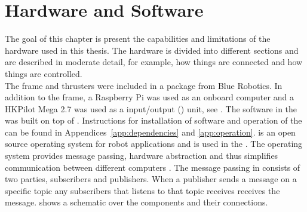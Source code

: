 \chapter{Hardware and Software}\label{cha:hardware}
The goal of this chapter is present the capabilities and limitations of the hardware used in this thesis. The hardware is divided into different sections and are described in moderate detail, for example, how things are connected and how things are controlled.\\
The \abbrROV frame and thrusters were included in a package from Blue Robotics. In addition to the \abbrROV frame, a Raspberry Pi was used as an onboard computer and a HKPilot Mega 2.7  was used as a input/output (\abbrIO) unit, see . The software in the \abbrROV was built on top of \abbrROS.  Instructions for installation of software and operation of the \abbrROV can be found in Appendices~\ref{app:dependencies} and \ref{app:operation}. \abbrROS is an open source operating system for robot applications and is used in the \abbrROV. The operating system provides message passing, hardware abstraction and thus simplifies communication between different computers \citep{ROS}. The message passing in \abbrROS consists of two parties, subscribers and publishers. When a publisher sends a message on a specific topic any subscribers that listens to that topic receives receives the message.  shows a schematic over the \abbrROV components and their connections.

